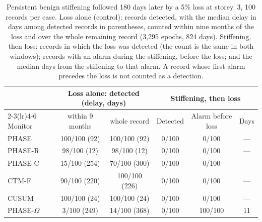 \documentclass[12pt,a4paper]{article}
\newenvironment{revblock}{}{}
\newenvironment{revblock}{\begingroup\color{revcol}}{\endgroup}
\newcommand{\rtwo}[1]{#1}
\newcommand{\rtwo}[1]{{\color{revcolb}#1}}
\begin{document}
\begin{revblock}
\begin{table}[t]
\centering
\small
\caption{\rtwo{Persistent benign stiffening followed 180 days later by a 5\% loss at storey~3, 100 records per case.} \rtwo{Loss alone (control): records detected, with the median delay in days among detected records in parentheses, counted within nine months of the loss and over the whole remaining record (3{,}295 epochs, 824 days).} \rtwo{Stiffening, then loss: records in which the loss was detected (the count is the same in both windows); records with an alarm during the stiffening, before the loss; and the median days from the stiffening to that alarm.} \rtwo{A record whose first alarm precedes the loss is not counted as a detection.}}
\label{tab:masked}
\setlength{\tabcolsep}{3pt}
\begin{tabular}{lccccc}
\toprule
 & \multicolumn{2}{c}{Loss alone: detected (delay, days)} & \multicolumn{3}{c}{Stiffening, then loss}  \\
\cmidrule(lr){2-3}\cmidrule(lr){4-6}
Monitor & \rtwo{within 9 months} & \rtwo{whole record} & Detected & Alarm before loss & Days  \\
\midrule
PHASE & \rtwo{100/100 (92)} & \rtwo{100/100 (92)} & 0/100 & 0/100 & ---  \\
PHASE-R & \rtwo{98/100 (12)} & \rtwo{98/100 (12)} & 0/100 & 0/100 & ---  \\
PHASE-C & \rtwo{15/100 (254)} & \rtwo{70/100 (300)} & 0/100 & 0/100 & ---  \\
CTM-F & \rtwo{90/100 (220)} & \rtwo{100/100 (226)} & 0/100 & 0/100 & ---  \\
CUSUM & \rtwo{100/100 (24)} & \rtwo{100/100 (24)} & 0/100 & 0/100 & ---  \\
PHASE-$\Omega$ & \rtwo{3/100 (249)} & \rtwo{14/100 (368)} & 0/100 & 100/100 & 11  \\
\bottomrule
\end{tabular}
\end{table}


\end{revblock}
\end{document}
